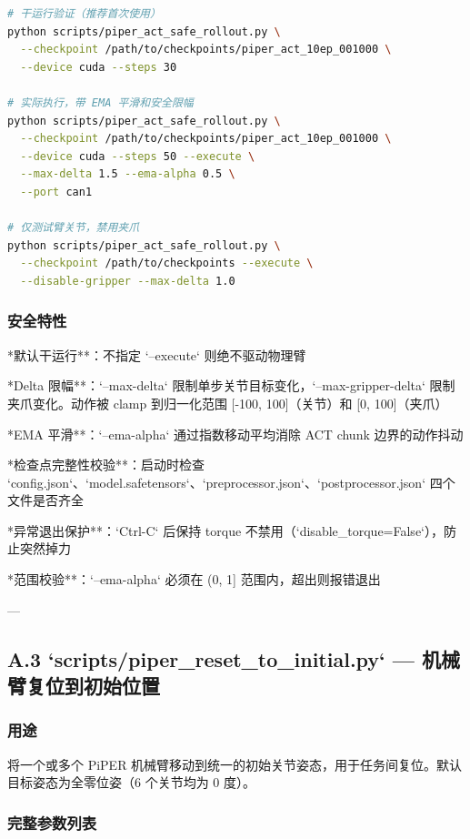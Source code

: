 \documentclass[UTF8,a4paper,11pt]{ctexart}
\begin{document}
{\begin{lstlisting}[language=bash]
# 干运行验证（推荐首次使用）
python scripts/piper_act_safe_rollout.py \
  --checkpoint /path/to/checkpoints/piper_act_10ep_001000 \
  --device cuda --steps 30

# 实际执行，带 EMA 平滑和安全限幅
python scripts/piper_act_safe_rollout.py \
  --checkpoint /path/to/checkpoints/piper_act_10ep_001000 \
  --device cuda --steps 50 --execute \
  --max-delta 1.5 --ema-alpha 0.5 \
  --port can1

# 仅测试臂关节，禁用夹爪
python scripts/piper_act_safe_rollout.py \
  --checkpoint /path/to/checkpoints --execute \
  --disable-gripper --max-delta 1.0
\end{lstlisting}

\subsubsection{安全特性}

\item **默认干运行**：不指定 `--execute` 则绝不驱动物理臂
\item **Delta 限幅**：`--max-delta` 限制单步关节目标变化，`--max-gripper-delta` 限制夹爪变化。动作被 clamp 到归一化范围 [-100, 100]（关节）和 [0, 100]（夹爪）
\item **EMA 平滑**：`--ema-alpha` 通过指数移动平均消除 ACT chunk 边界的动作抖动
\item **检查点完整性校验**：启动时检查 `config.json`、`model.safetensors`、`preprocessor.json`、`postprocessor.json` 四个文件是否齐全
\item **异常退出保护**：`Ctrl-C` 后保持 torque 不禁用（`disable_torque=False`），防止突然掉力
\item **范围校验**：`--ema-alpha` 必须在 (0, 1] 范围内，超出则报错退出

---

\subsection{A.3 `scripts/piper_reset_to_initial.py` — 机械臂复位到初始位置}

\subsubsection{用途}

将一个或多个 PiPER 机械臂移动到统一的初始关节姿态，用于任务间复位。默认目标姿态为全零位姿（6 个关节均为 0 度）。

\subsubsection{完整参数列表}

}
\end{document}
